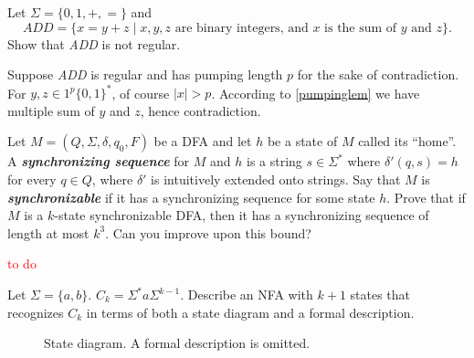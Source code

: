 \begin{exercise}{1.53}
  Let $\Sigma = \{0, 1, +, =\}$ and
  \[
    \textit{ADD} = \{x = y + z \mid x, y, z \text{ are binary integers, and } x \text{ is the sum of } y \text{ and } z\}.
  \]
  Show that \textit{ADD} is not regular.
\end{exercise}

Suppose \textit{ADD} is regular and has pumping length $p$ for the sake of contradiction. For $y,z\in1^p\{0,1\}^*$, of course $|x|>p$. According to \ref{pumpinglem} we have multiple sum of $y$ and $z$, hence contradiction.

\setcounter{exercise}{58}

\begin{exercise}{1.59}
  Let $M = (Q, \Sigma, \delta, q_0, F)$ be a DFA and let $h$ be a state of $M$ called its ``home''. A \textbf{\textit{synchronizing sequence}} for $M$ and $h$ is a string $s \in \Sigma^*$ where $\delta'(q, s) = h$ for every $q \in Q$, where $\delta'$ is intuitively extended onto strings. Say that $M$ is \textbf{\textit{synchronizable}} if it has a synchronizing sequence for some state $h$. Prove that if $M$ is a $k$-state synchronizable DFA, then it has a synchronizing sequence of length at most $k^3$. Can you improve upon this bound?
\end{exercise}

\textcolor{red}{to do}

\begin{exercise}{1.60}
  Let $\Sigma = \{a, b\}$. $C_k = \Sigma^* a \Sigma^{k-1}$. Describe an NFA with $k + 1$ states that recognizes $C_k$ in terms of both a state diagram and a formal description.
\end{exercise}

\begin{figure}[H]
  \centering
  \caption{State diagram. A formal description is omitted.}
\end{figure}

